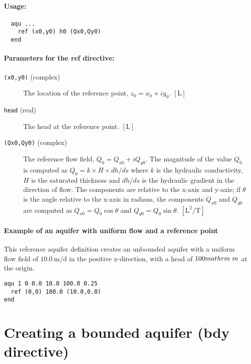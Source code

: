 \paragraph{Usage:}
\begin{verbatim}
  aqu ...
    ref (x0,y0) h0 (Qx0,Qy0) 
  end
\end{verbatim}
\paragraph{Parameters for the ref directive: }
\begin{description}
\item [{\texttt{(x0,y0)}} (complex)] The location of the reference point, $z_{0}=x_{0}+iy_{0}$. $[\mathrm{L}]$
\item [{\texttt{head}} (real)] The head at the reference point. $[\mathrm{L}]$ 
\item [{\texttt{(Qx0,Qy0)}} (complex)] The reference flow field, $Q_{0}=Q_{x0}+iQ_{y0}$. The magnitude of the value $Q_{0}$ is computed as $Q_{0}=k\times H\times dh/ds$ where $k$ is the hydraulic conductivity, $H$ is the saturated thickness and $dh/ds$ is the hydraulic gradient in the direction of flow. The components are relative to the x-axis and y-axis; if $\theta$ is the angle relative to the x-axis in radians, the components $Q_{x0}$ and $Q_{y0}$ are computed as $Q_{x0}=Q_{0}\cos\theta$ and $Q_{y0}=Q_{0}\sin\theta$. $[\mathrm{L^{2}/T}]$ 
\end{description}
\paragraph{Example of an aquifer with uniform flow and a reference point}
This reference aquifer definition creates an unbounded aquifer with
a uniform flow field of $10.0\mathrm{\ m/d}$ in the positive x-direction, with a head of $100\\mathrm{\ m}$ at the origin.
\begin{verbatim}
aqu 1 0 0.0 10.0 100.0 0.25
  ref (0,0) 100.0 (10.0,0.0) 
end
\end{verbatim}

\section{Creating a bounded aquifer (\textsf{bdy} directive)\label{sub:bounded-aquifers}}


